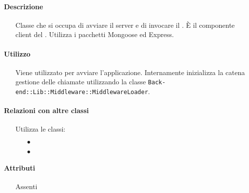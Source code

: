 \paragraph*{Descrizione}
\begin{itemize}
\item[] Classe che si occupa di avviare il server e di invocare il . È il componente client del  . Utilizza i pacchetti Mongoose ed Express.
\end{itemize}

\paragraph*{Utilizzo}
\begin{itemize}
\item[] Viene utilizzato per avviare l'applicazione. Internamente inizializza la catena gestione delle chiamate utilizzando la classe \texttt{Back-end::Lib::Middleware::MiddlewareLoader}.
\end{itemize}

\paragraph*{Relazioni con altre classi}
\begin{itemize}


\item[] Utilizza le classi:
\begin{itemize}
\item[$\bullet$] 
\item[$\bullet$] 
\end{itemize}
\end{itemize}

\paragraph*{Attributi}
\begin{itemize}
\item[] Assenti
\end{itemize}

